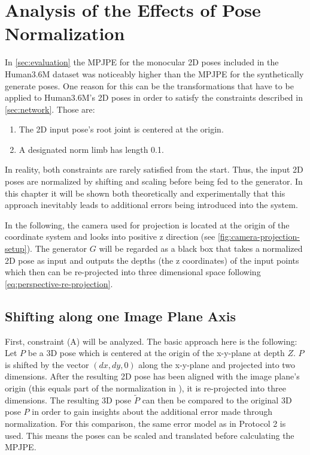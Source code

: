 \section{Analysis of the Effects of Pose Normalization}
\label{sec:effects-of-normalization}

In \autoref{sec:evaluation} the MPJPE for the monocular 2D poses included in the Human3.6M dataset was noticeably higher than the MPJPE for the synthetically generate poses.
One reason for this can be the transformations that have to be applied to Human3.6M's 2D poses in order to satisfy the constraints described in \autoref{sec:network}.
Those  are:
\begin{enumerate}[label=(\Alph*)]
	\item The 2D input pose's root joint is centered at the origin.
	\item A designated norm limb has length 0.1.
\end{enumerate}

In reality, both constraints are rarely satisfied from the start.
Thus, the input 2D poses are normalized by shifting and scaling before being fed to the generator.
In this chapter it will be shown both theoretically and experimentally that this approach inevitably leads to additional errors being introduced into the system.

In the following, the camera used for projection is located at the origin of the coordinate system and looks into positive z direction (see \autoref{fig:camera-projection-setup}).
The generator $G$ will be regarded as a black box that takes a normalized 2D pose as input and outputs the depths (the z coordinates) of the input points which then can be re-projected into three dimensional space following \autoref{eq:perspective-re-projection}.

\subsection{Shifting along one Image Plane Axis}
\label{sec:x-shift-error}
First, constraint (A) will be analyzed.
The basic approach here is the following:
Let $P$ be a 3D pose which is centered at the origin of the x-y-plane at depth $Z$.
$P$ is shifted by the vector $(dx, dy, 0)$ along the x-y-plane and projected into two dimensions.
After the resulting 2D pose has been aligned with the image plane's origin (this equals part of the normalization in \cite{drover18}), it is re-projected into three dimensions.
The resulting 3D pose $\widetilde{P}$ can then be compared to the original 3D pose $P$ in order to gain insights about the additional error made through normalization.
For this comparison, the same error model as in Protocol 2 is used.
This means the poses can be scaled and translated before calculating the MPJPE.

